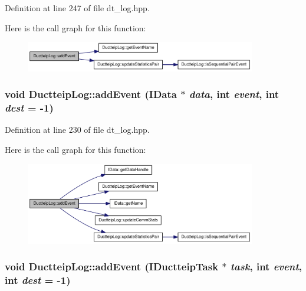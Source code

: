 Definition at line 247 of file dt\_\-log.hpp.

Here is the call graph for this function:\nopagebreak
\begin{figure}[H]
\begin{center}
\leavevmode
\includegraphics[width=284pt]{class_ductteip_log_afb6106d874d89989c58027cc1ac569e4_cgraph}
\end{center}
\end{figure}
\hypertarget{class_ductteip_log_abdacf59e313a1e510c76e84c22082287}{
\subsubsection[{addEvent}]{\setlength{\rightskip}{0pt plus 5cm}void DuctteipLog::addEvent ({\bf IData} $\ast$ {\em data}, \/  int {\em event}, \/  int {\em dest} = {\ttfamily -\/1})}}
\label{class_ductteip_log_abdacf59e313a1e510c76e84c22082287}


Definition at line 230 of file dt\_\-log.hpp.

Here is the call graph for this function:\nopagebreak
\begin{figure}[H]
\begin{center}
\leavevmode
\includegraphics[width=284pt]{class_ductteip_log_abdacf59e313a1e510c76e84c22082287_cgraph}
\end{center}
\end{figure}
\hypertarget{class_ductteip_log_a2038f71b600647a1899da3a0022f9fc1}{
\subsubsection[{addEvent}]{\setlength{\rightskip}{0pt plus 5cm}void DuctteipLog::addEvent ({\bf IDuctteipTask} $\ast$ {\em task}, \/  int {\em event}, \/  int {\em dest} = {\ttfamily -\/1})}}
\label{class_ductteip_log_a2038f71b600647a1899da3a0022f9fc1}


